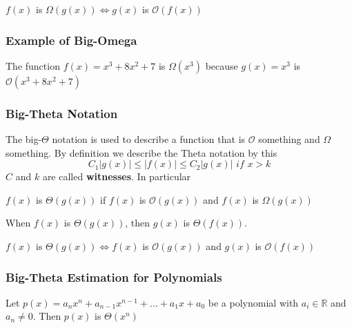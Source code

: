\documentclass{article}
\begin{document}
\begin{tcolorbox}[sharp corners, colback=green!30, colframe=green!80!blue, title=Equivalence Big-O and Big-Omega]
$ f(x) $ is $ \Omega(g(x)) \Leftrightarrow g(x) $ is $ \mathcal{O}(f(x)) $
\end{tcolorbox}

\subsubsection{Example of Big-Omega} The function $ f(x) = x^3 + 8x^2 + 7 $ is $ \Omega(x^3) $ because $ g(x) = x^3 $ is $ \mathcal{O}(x^3 + 8x^2 + 7) $

\subsubsection{Big-Theta Notation} The big-$ \Theta $ notation is used to describe a function that is $ \mathcal{O} $ something and $ \Omega $ something. By definition we describe the Theta notation by this
\begin{equation}
C_1|g(x)| \leq |f(x)| \leq C_2|g(x)| \textit{ if } x > k
\end{equation}
$ C $ and $ k $ are called \textbf{witnesses}. In particular
\begin{tcolorbox}[sharp corners, colback=green!30, colframe=green!80!blue, title=Big-Theta Definition]
$ f(x) $ is $ \Theta(g(x)) $ if $ f(x) $ is $ \mathcal{O}(g(x)) $ and $ f(x) $ is $ \Omega(g(x)) $
\end{tcolorbox}

\begin{tcolorbox}[sharp corners, colback=green!30, colframe=green!80!blue, title=Implication of Theta Notation]
When $ f(x) $ is $ \Theta(g(x)) $, then $ g(x) $ is $ \Theta(f(x)) $. 
\end{tcolorbox}

\begin{tcolorbox}[sharp corners, colback=green!30, colframe=green!80!blue, title=Equivalence of Theta Notation]
$ f(x) $ is $ \Theta(g(x)) \Leftrightarrow f(x) $ is $ \mathcal{O}(g(x)) $ and $ g(x) $ is $ \mathcal{O}(f(x)) $
\end{tcolorbox}

\subsubsection{Big-Theta Estimation for Polynomials}
\begin{tcolorbox}[sharp corners, colback=green!30, colframe=green!80!blue, title=Complexity of Polynomials]
Let $ p(x) = a_{n}x^{n} + a_{n-1}x^{n-1} + ... + a_{1}x + a_0 $ be a polynomial with $ a_i \in \mathbb{R} $ and $ a_n \neq 0 $. Then $ p(x) $ is $ \Theta(x^n) $
\end{tcolorbox}
\end{document}
